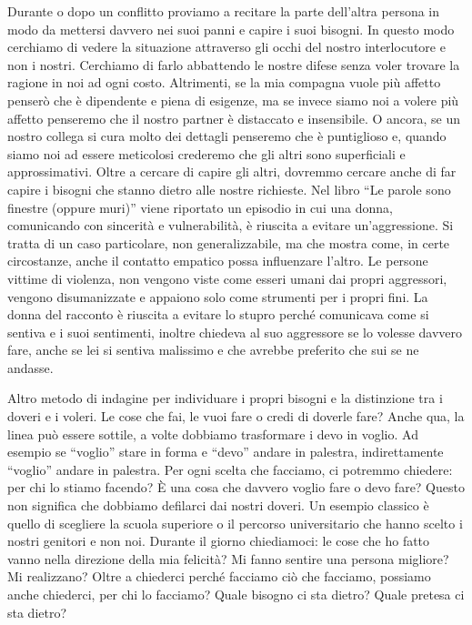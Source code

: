 \documentclass[12pt]{book} %
\begin{document}
Durante o dopo un conflitto proviamo a recitare la parte dell'altra persona in modo da mettersi davvero nei suoi panni e capire
i suoi bisogni. In questo modo cerchiamo di vedere la situazione attraverso gli occhi del nostro interlocutore e non i
nostri. Cerchiamo di farlo abbattendo le nostre difese senza voler trovare la ragione in noi ad ogni costo.
Altrimenti, se la mia compagna vuole più affetto penserò che è dipendente e piena di esigenze, ma se invece siamo noi a
volere più affetto penseremo che il nostro partner è distaccato e insensibile. O ancora, se un nostro collega si cura
molto dei dettagli penseremo che è puntiglioso e, quando siamo noi ad essere meticolosi crederemo che gli altri sono
superficiali e approssimativi. Oltre a cercare di capire gli altri, dovremmo cercare anche di far capire i bisogni che
stanno dietro alle nostre richieste. Nel libro “Le parole sono finestre (oppure
muri)” viene riportato un episodio in cui una donna, comunicando con sincerità e vulnerabilità, è riuscita a evitare un’aggressione. Si tratta di un caso particolare, non generalizzabile, ma che mostra come, in certe circostanze, anche il contatto empatico possa influenzare l’altro. Le persone vittime di violenza, non vengono viste come esseri umani dai propri aggressori, vengono
disumanizzate e appaiono solo come strumenti per i propri fini. La donna del racconto è riuscita a evitare lo stupro
perché comunicava come si sentiva e i suoi sentimenti, inoltre chiedeva al suo aggressore se lo volesse davvero fare,
anche se lei si sentiva malissimo e che avrebbe preferito che sui se ne andasse. 

Altro metodo di indagine per individuare i propri bisogni e la distinzione tra i doveri e i voleri. Le cose che fai, le
vuoi fare o credi di doverle fare? Anche qua, la linea può essere sottile, a volte dobbiamo trasformare i devo in
voglio. Ad esempio se “voglio” stare in forma e “devo” andare in palestra, indirettamente “voglio” andare in palestra.
Per ogni scelta che facciamo, ci potremmo chiedere: per chi
lo stiamo facendo? È una cosa che davvero voglio fare o devo fare? Questo non significa che dobbiamo defilarci dai
nostri doveri. Un esempio classico è quello di scegliere la scuola superiore o il percorso universitario che hanno
scelto i nostri genitori e non noi. Durante il giorno chiediamoci: le cose che ho fatto vanno nella direzione della
mia felicità? Mi fanno sentire una persona migliore? Mi realizzano? 
Oltre a chiederci perché facciamo ciò che facciamo, possiamo anche chiederci, per chi lo facciamo?
Quale bisogno ci sta dietro? Quale pretesa ci sta dietro?
\end{document}
